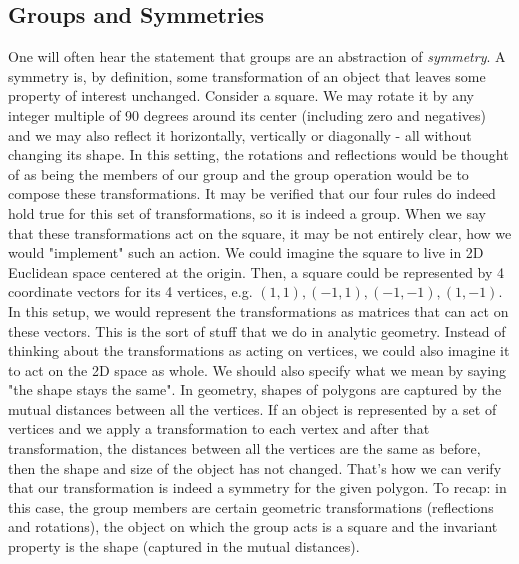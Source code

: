 \subsection{Groups and Symmetries}
One will often hear the statement that groups are an abstraction of \emph{symmetry}. A symmetry is, by definition, some transformation of an object that leaves some property of interest unchanged. Consider a square. We may rotate it by any integer multiple of 90 degrees around its center (including zero and negatives) and we may also reflect it horizontally, vertically or diagonally - all without changing its shape. In this setting, the rotations and reflections would be thought of as being the members of our group and the group operation would be to compose these transformations. It may be verified that our four rules do indeed hold true for this set of transformations, so it is indeed a group. When we say that these transformations act on the square, it may be not entirely clear, how we would "implement" such an action. We could imagine the square to live in 2D Euclidean space centered at the origin. Then, a square could be represented by 4 coordinate vectors for its 4 vertices, e.g. $(1,1),(-1,1),(-1,-1),(1,-1)$. In this setup, we would represent the transformations as matrices that can act on these vectors. This is the sort of stuff that we do in analytic geometry. Instead of thinking about the transformations as acting on vertices, we could also imagine it to act on the 2D space as whole. We should also specify what we mean by saying "the shape stays the same". In geometry, shapes of polygons are captured by the mutual distances between all the vertices. If an object is represented by a set of vertices and we apply a transformation to each vertex and after that transformation, the distances between all the vertices are the same as before, then the shape and size of the object has not changed. That's how we can verify that our transformation is indeed a symmetry for the given polygon. To recap: in this case, the group members are certain geometric transformations (reflections and rotations), the object on which the group acts is a square and the invariant property is the shape (captured in the mutual distances).

